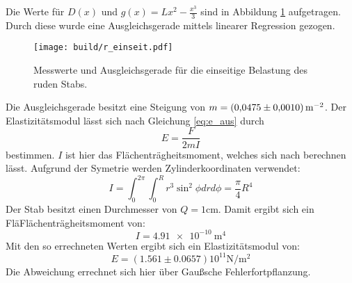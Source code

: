 \noindent Die Werte für $D(x)$ und $g(x)=Lx^2-\frac{x^3}{3}$ sind in Abbildung \ref{fig:plot1} aufgetragen.
Durch diese wurde eine Ausgleichsgerade mittels linearer Regression gezogen.
\begin{figure}
    \centering
    \texttt{[image: build/r\_einseit.pdf]}
    \caption{Messwerte und Ausgleichsgerade für die einseitige Belastung des ruden Stabs.}
    \label{fig:plot1}
\end{figure}
%
Die Ausgleichsgerade besitzt eine Steigung von $m=\SI[per-mode=reciprocal]{0.0475\pm 0.001}{\per\meter\squared}$.
Der Elastizitätsmodul lässt sich nach Gleichung \eqref{eq:e_aus} durch
\begin{equation}
  E=\frac{F}{2mI}
\end{equation}
bestimmen.
$I$ ist hier das Flächenträgheitsmoment, welches sich nach berechnen lässt.
Aufgrund der Symetrie werden Zylinderkoordinaten verwendet:
\begin{equation}
  I=\int_0^{2\pi} \int_0^R r^3 \sin^2{\phi} dr d\phi=\frac{\pi}{4}R^4
\end{equation}
Der Stab besitzt einen Durchmesser von $Q=1\si{\centi\meter}$.
Damit ergibt sich ein FläFlächenträgheitsmoment von:
\begin{equation*}
  I=\SI{4.91e-10}{\meter\tothe{4}}
\end{equation*}
Mit den so errechneten Werten ergibt sich ein Elastizitätsmodul von:
\begin{equation*}
  E=(1.561\pm0.0657)10^{11}\si{\newton\per\meter\squared}
\end{equation*}
Die Abweichung errechnet sich hier über Gaußsche Fehlerfortpflanzung.
